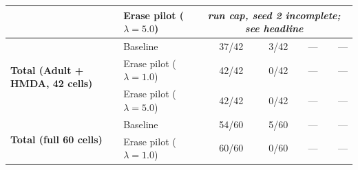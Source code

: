 \begin{table}[t]
\begin{tabular}{l l r r r r}
  & Erase pilot ($\lambda{=}5.0$)  & \multicolumn{4}{c}{\textit{run cap, seed 2 incomplete; see headline}} \\
\midrule
\multirow{3}{*}{\textbf{Total (Adult + HMDA, 42 cells)}}
  & Baseline                  & 37/42 & 3/42 & --- & --- \\
  & Erase pilot ($\lambda{=}1.0$)  & 42/42 & 0/42 & --- & --- \\
  & Erase pilot ($\lambda{=}5.0$)  & 42/42 & 0/42 & --- & --- \\
\midrule
\multirow{2}{*}{\textbf{Total (full 60 cells)}}
  & Baseline                  & 54/60 & 5/60 & --- & --- \\
  & Erase pilot ($\lambda{=}1.0$)  & 60/60 & 0/60 & --- & --- \\
\bottomrule
\end{tabular}
\end{table}
